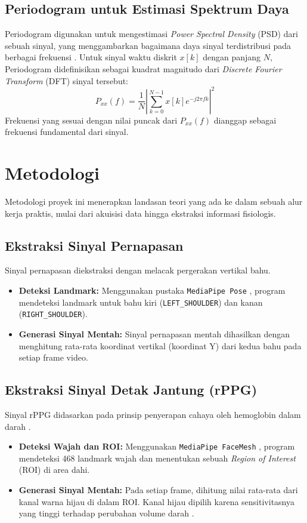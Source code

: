 \documentclass[11pt,a4paper]{article}
\begin{document}
\subsection{Periodogram untuk Estimasi Spektrum Daya}
Periodogram digunakan untuk mengestimasi \textit{Power Spectral Density} (PSD) dari sebuah sinyal, yang menggambarkan bagaimana daya sinyal terdistribusi pada berbagai frekuensi \cite{proakis2007}. Untuk sinyal waktu diskrit $x[k]$ dengan panjang $N$, Periodogram didefinisikan sebagai kuadrat magnitudo dari \textit{Discrete Fourier Transform} (DFT) sinyal tersebut:
\begin{equation}
P_{xx}(f) = \frac{1}{N} \left| \sum_{k=0}^{N-1} x[k] e^{-j2\pi fk} \right|^2
\end{equation}
Frekuensi yang sesuai dengan nilai puncak dari $P_{xx}(f)$ dianggap sebagai frekuensi fundamental dari sinyal.

\section{Metodologi}
Metodologi proyek ini menerapkan landasan teori yang ada ke dalam sebuah alur kerja praktis, mulai dari akuisisi data hingga ekstraksi informasi fisiologis.

\subsection{Ekstraksi Sinyal Pernapasan}
Sinyal pernapasan diekstraksi dengan melacak pergerakan vertikal bahu.
\begin{itemize}
    \item \textbf{Deteksi Landmark:} Menggunakan pustaka \texttt{MediaPipe Pose} \cite{bazarevsky2020}, program mendeteksi landmark untuk bahu kiri (\texttt{LEFT\_SHOULDER}) dan kanan (\texttt{RIGHT\_SHOULDER}).
    \item \textbf{Generasi Sinyal Mentah:} Sinyal pernapasan mentah dihasilkan dengan menghitung rata-rata koordinat vertikal (koordinat Y) dari kedua bahu pada setiap frame video.
\end{itemize}

\subsection{Ekstraksi Sinyal Detak Jantung (rPPG)}
Sinyal rPPG didasarkan pada prinsip penyerapan cahaya oleh hemoglobin dalam darah \cite{verkruysse2008}.
\begin{itemize}
    \item \textbf{Deteksi Wajah dan ROI:} Menggunakan \texttt{MediaPipe FaceMesh} \cite{kartynnik2019}, program mendeteksi 468 landmark wajah dan menentukan sebuah \textit{Region of Interest} (ROI) di area dahi.
    \item \textbf{Generasi Sinyal Mentah:} Pada setiap frame, dihitung nilai rata-rata dari kanal warna hijau di dalam ROI. Kanal hijau dipilih karena sensitivitasnya yang tinggi terhadap perubahan volume darah \cite{verkruysse2008}.
\end{itemize}
\end{document}
